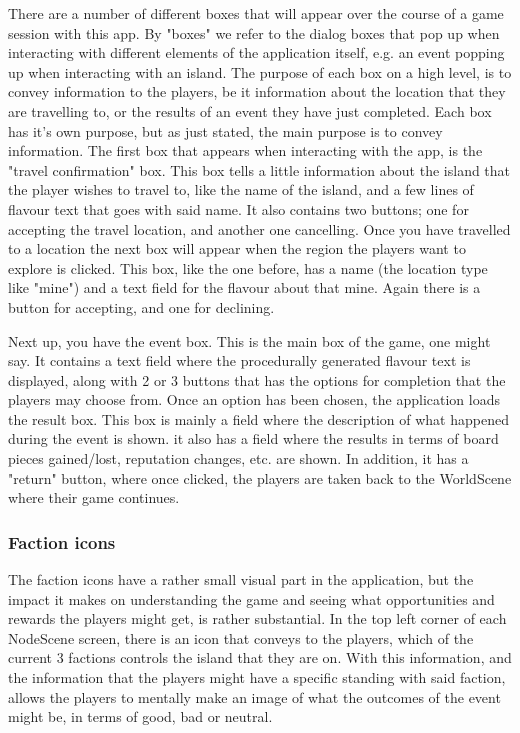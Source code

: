 There are a number of different boxes that will appear over the course of a game session with this app. By "boxes" we refer to the dialog boxes that pop up when interacting with different elements of the application itself, e.g. an event popping up when interacting with an island.
The purpose of each box on a high level, is to convey information to the players, be it information about the location that they are travelling to, or the results of an event they have just completed.
Each box has it's own purpose, but as just stated, the main purpose is to convey information. The first box that appears when interacting with the app, is the "travel confirmation" box. This box tells a little information about the island that the player wishes to travel to, like the name of the island, and a few lines of flavour text that goes with said name. It also contains two buttons; one for accepting the travel location, and another one cancelling.
Once you have travelled to a location the next box will appear when the region the players want to explore is clicked. This box, like the one before, has a name (the location type like "mine") and a text field for the flavour about that mine. Again there is a button for accepting, and one for declining. 

Next up, you have the event box. This is the main box of the game, one might say. It contains a text field where the procedurally generated flavour text is displayed, along with 2 or 3 buttons that has the options for completion that the players may choose from. 
Once an option has been chosen, the application loads the result box. This box is mainly a field where the description of what happened during the event is shown. it also has a field where the results in terms of board pieces gained/lost, reputation changes, etc. are shown. In addition, it has a "return" button, where once clicked, the players are taken back to the WorldScene where their game continues.


\subsubsection{Faction icons}
The faction icons have a rather small visual part in the application, but the impact it makes on understanding the game and seeing what opportunities and rewards the players might get, is rather substantial. In the top left corner of each NodeScene screen, there is an icon that conveys to the players, which of the current 3 factions controls the island that they are on. With this information, and the information that the players might have a specific standing with said faction, allows the players to mentally make an image of what the outcomes of the event might be, in terms of good, bad or neutral.

